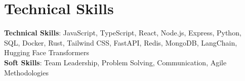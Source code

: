\documentclass[letterpaper,11pt]{article}
\begin{document}
\section{Technical Skills}
 \begin{itemize}[leftmargin=0.15in, label={}]
    \small{\item{
     \textbf{Technical Skills}{: JavaScript, TypeScript, React, Node.js, Express, Python, SQL, Docker, Rust, Tailwind CSS, FastAPI, Redis, MongoDB, LangChain, Hugging Face Transformers} \\
     \textbf{Soft Skills}{: Team Leadership, Problem Solving, Communication, Agile Methodologies} \\
    }}
 \end{itemize}
\end{document}
